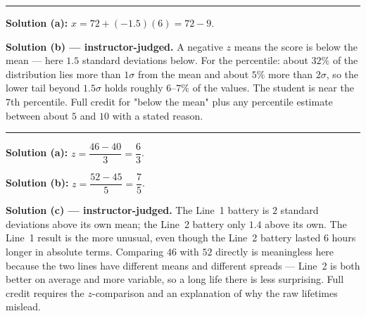 \documentclass[12pt]{article}
\begin{document}
\vspace{0.15cm}\noindent\rule{\linewidth}{0.2pt}\vspace{0.15cm}


\textbf{Solution (a):} \quad $x = 72 + (-1.5)(6) = 72 - 9$. 

\textbf{Solution (b) --- instructor-judged.} \quad A negative $z$ means the score is below the
mean --- here $1.5$ standard deviations below. For the percentile: about $32\%$ of the
distribution lies more than $1\sigma$ from the mean and about $5\%$ more than $2\sigma$, so the
lower tail beyond $1.5\sigma$ holds roughly $6$--$7\%$ of the values. The student is near the
$7$th percentile. Full credit for "below the mean" plus any percentile estimate between about
$5$ and $10$ with a stated reason.

\vspace{0.15cm}\noindent\rule{\linewidth}{0.2pt}\vspace{0.15cm}


\textbf{Solution (a):} \quad $z = \dfrac{46 - 40}{3} = \dfrac{6}{3}$. 

\textbf{Solution (b):} \quad $z = \dfrac{52 - 45}{5} = \dfrac{7}{5}$. 

\textbf{Solution (c) --- instructor-judged.} \quad The Line~1 battery is $2$ standard
deviations above its own mean; the Line~2 battery only $1.4$ above its own. The Line~1 result
is the more unusual, even though the Line~2 battery lasted $6$ hours longer in absolute terms.
Comparing $46$ with $52$ directly is meaningless here because the two lines have different
means and different spreads --- Line~2 is both better on average and more variable, so a long
life there is less surprising. Full credit requires the $z$-comparison and an explanation of
why the raw lifetimes mislead.
\end{document}
